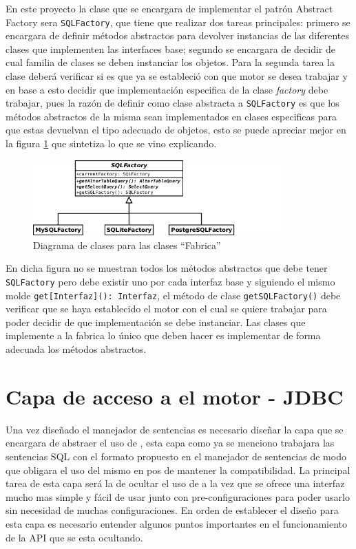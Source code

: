 En este proyecto la clase que se encargara de implementar el patrón Abstract Factory sera \verb=SQLFactory=, que tiene que realizar dos tareas principales: primero se encargara de definir métodos abstractos para devolver instancias de las diferentes clases que implementen las interfaces base; segundo se encargara de decidir de cual familia de clases se deben instanciar los objetos. Para la segunda tarea la clase deberá verificar si es que ya se estableció con que motor se desea trabajar y en base a esto decidir que implementación especifica de la clase \textit{factory} debe trabajar, pues la razón de definir como clase abstracta a \verb=SQLFactory= es que los métodos abstractos de la misma sean implementados en clases especificas para que estas devuelvan el tipo adecuado de objetos, esto se puede apreciar mejor en la figura \ref{fig:crossdb-factory} que sintetiza lo que se vino explicando. 
%
\begin{figure}
  \centering
    \includegraphics[width=0.85\textwidth]{figuras/crossdb-factory.png}
  \caption{Diagrama de clases para las clases ``Fabrica''}
  \label{fig:crossdb-factory}
\end{figure}

En dicha figura no se muestran todos los métodos abstractos que debe tener \verb=SQLFactory= pero debe existir uno por cada interfaz base y siguiendo el mismo molde \verb=get[Interfaz](): Interfaz=, el método de clase \verb=getSQLFactory()= debe verificar que se haya establecido el motor con el cual se quiere trabajar para poder decidir de que implementación se debe instanciar. Las clases que implemente a la fabrica lo único que deben hacer es implementar de forma adecuada los métodos abstractos.  
%
\section{Capa de acceso a el motor - JDBC}
Una vez diseñado el manejador de sentencias es necesario diseñar la capa que se encargara de abstraer el uso de \jd, esta capa como ya se menciono trabajara las sentencias SQL con el formato propuesto en el manejador de sentencias de modo que obligara el uso del mismo en pos de mantener la compatibilidad. La principal tarea de esta capa será la de ocultar el uso de \jd  a la vez que se ofrece una interfaz mucho mas simple y fácil de usar junto con pre-configuraciones para poder usarlo sin necesidad de muchas configuraciones. En orden de establecer el diseño para esta capa es necesario entender algunos puntos importantes en el funcionamiento de la API que se esta ocultando.
%
